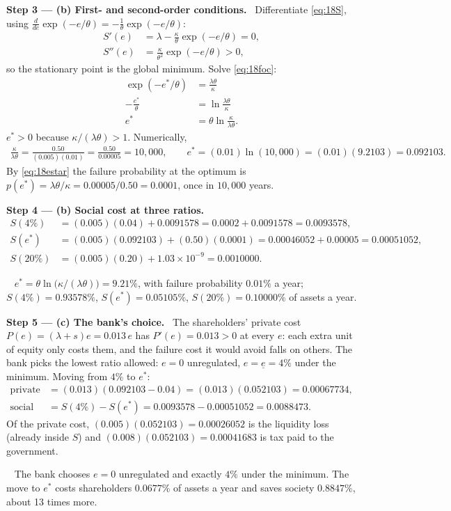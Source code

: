 \documentclass[11pt,a4paper]{article}
\numberwithin{equation}{section}
\newcommand{\step}[2]{\par\smallskip\noindent\textbf{Step #1 --- #2.}~}
\newcommand{\answer}[1]{\par\smallskip\noindent\fbox{\textbf{Answer #1.}}~}
\begin{document}
\step{3}{(b) First- and second-order conditions} Differentiate \eqref{eq:18S}, using
$\frac{d}{de}\exp(-e/\theta)=-\frac1\theta\exp(-e/\theta)$:
\begin{align}
  S'(e) &= \lambda-\frac{\kappa}{\theta}\exp(-e/\theta)=0, \label{eq:18foc}\\
  S''(e) &= \frac{\kappa}{\theta^2}\exp(-e/\theta)>0, \nonumber
\end{align}
so the stationary point is the global minimum. Solve \eqref{eq:18foc}:
\begin{align}
  \exp(-e^*/\theta) &= \frac{\lambda\theta}{\kappa} \nonumber\\
  -\frac{e^*}{\theta} &= \ln\frac{\lambda\theta}{\kappa} \nonumber\\
  e^* &= \theta\ln\frac{\kappa}{\lambda\theta}. \label{eq:18estar}
\end{align}
$e^*>0$ because $\kappa/(\lambda\theta)>1$. Numerically,
\begin{align}
  \frac{\kappa}{\lambda\theta}=\frac{0.50}{(0.005)(0.01)}=\frac{0.50}{0.00005}=10{,}000,\qquad
  e^*=(0.01)\ln(10{,}000)=(0.01)(9.2103)=0.092103. \nonumber
\end{align}
By \eqref{eq:18estar} the failure probability at the optimum is
$p(e^*)=\lambda\theta/\kappa=0.00005/0.50=0.0001$, once in $10{,}000$ years.

\step{4}{(b) Social cost at three ratios}
\begin{align}
  S(4\%) &= (0.005)(0.04)+0.0091578=0.0002+0.0091578=0.0093578, \nonumber\\
  S(e^*) &= (0.005)(0.092103)+(0.50)(0.0001)=0.00046052+0.00005=0.00051052, \nonumber\\
  S(20\%) &= (0.005)(0.20)+1.03\times10^{-9}=0.0010000. \nonumber
\end{align}
\answer{(b)} $e^*=\theta\ln\bigl(\kappa/(\lambda\theta)\bigr)=9.21\%$, with failure probability $0.01\%$ a
year; $S(4\%)=0.93578\%$, $S(e^*)=0.05105\%$, $S(20\%)=0.10000\%$ of assets a year.

\step{5}{(c) The bank's choice} The shareholders' private cost $P(e)=(\lambda+s)e=0.013\,e$ has
$P'(e)=0.013>0$ at every $e$: each extra unit of equity only costs them, and the failure cost it would
avoid falls on others. The bank picks the lowest ratio allowed: $e=0$ unregulated, $e=\underline e=4\%$
under the minimum. Moving from $4\%$ to $e^*$:
\begin{align}
  \text{private cost} &= (0.013)(0.092103-0.04)=(0.013)(0.052103)=0.00067734, \nonumber\\
  \text{social gain} &= S(4\%)-S(e^*)=0.0093578-0.00051052=0.0088473. \nonumber
\end{align}
Of the private cost, $(0.005)(0.052103)=0.00026052$ is the liquidity loss (already inside $S$) and
$(0.008)(0.052103)=0.00041683$ is tax paid to the government.
\answer{(c)} The bank chooses $e=0$ unregulated and exactly $4\%$ under the minimum. The move to $e^*$
costs shareholders $0.0677\%$ of assets a year and saves society $0.8847\%$, about 13 times more.
\end{document}

